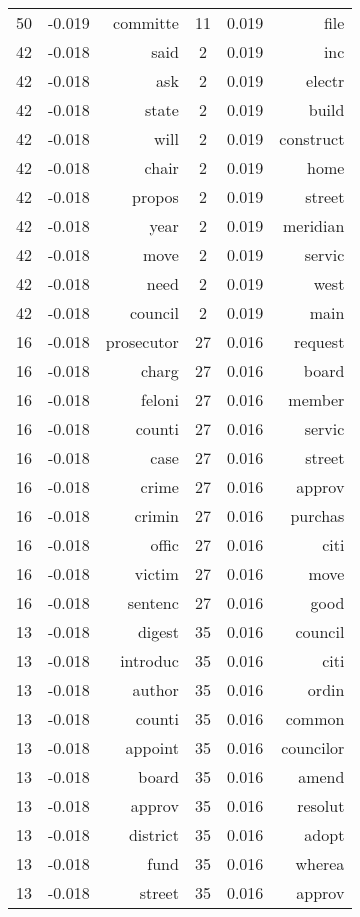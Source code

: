 \begin{table}[ht]
\begin{tabular}{ccr|ccr}
    50 & -0.019 & committe &   11 & 0.019 & file \\ 
   \cmidrule(l){1-3} \cmidrule(l){4-6}
  42 & -0.018 & said &    2 & 0.019 & inc \\ 
    42 & -0.018 & ask &    2 & 0.019 & electr \\ 
    42 & -0.018 & state &    2 & 0.019 & build \\ 
    42 & -0.018 & will &    2 & 0.019 & construct \\ 
    42 & -0.018 & chair &    2 & 0.019 & home \\ 
    42 & -0.018 & propos &    2 & 0.019 & street \\ 
    42 & -0.018 & year &    2 & 0.019 & meridian \\ 
    42 & -0.018 & move &    2 & 0.019 & servic \\ 
    42 & -0.018 & need &    2 & 0.019 & west \\ 
    42 & -0.018 & council &    2 & 0.019 & main \\ 
   \cmidrule(l){1-3} \cmidrule(l){4-6}
  16 & -0.018 & prosecutor &   27 & 0.016 & request \\ 
    16 & -0.018 & charg &   27 & 0.016 & board \\ 
    16 & -0.018 & feloni &   27 & 0.016 & member \\ 
    16 & -0.018 & counti &   27 & 0.016 & servic \\ 
    16 & -0.018 & case &   27 & 0.016 & street \\ 
    16 & -0.018 & crime &   27 & 0.016 & approv \\ 
    16 & -0.018 & crimin &   27 & 0.016 & purchas \\ 
    16 & -0.018 & offic &   27 & 0.016 & citi \\ 
    16 & -0.018 & victim &   27 & 0.016 & move \\ 
    16 & -0.018 & sentenc &   27 & 0.016 & good \\ 
   \cmidrule(l){1-3} \cmidrule(l){4-6}
  13 & -0.018 & digest &   35 & 0.016 & council \\ 
    13 & -0.018 & introduc &   35 & 0.016 & citi \\ 
    13 & -0.018 & author &   35 & 0.016 & ordin \\ 
    13 & -0.018 & counti &   35 & 0.016 & common \\ 
    13 & -0.018 & appoint &   35 & 0.016 & councilor \\ 
    13 & -0.018 & board &   35 & 0.016 & amend \\ 
    13 & -0.018 & approv &   35 & 0.016 & resolut \\ 
    13 & -0.018 & district &   35 & 0.016 & adopt \\ 
    13 & -0.018 & fund &   35 & 0.016 & wherea \\ 
    13 & -0.018 & street &   35 & 0.016 & approv \\ 
   \bottomrule 
\end{tabular}
\endgroup
\end{table}


